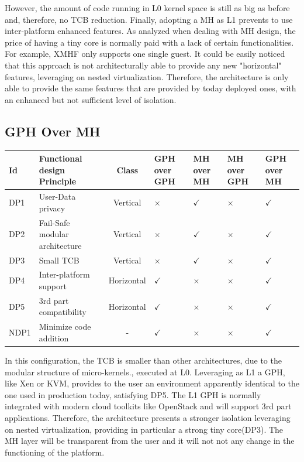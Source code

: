 \documentclass{sig-alternate}
\begin{document}
However, the amount of code running in L0 kernel space is still as big as before and, therefore, no TCB reduction. 
Finally, adopting a MH as L1 prevents to use inter-platform enhanced features. As analyzed when dealing with MH design, the price of having a tiny core is normally paid with a lack of certain functionalities. For example, XMHF only supports one single guest. It could be easily noticed that this approach is not architecturally able to provide any new "horizontal" features, leveraging on nested virtualization. Therefore, the architecture is only able to provide the same features that are provided by today deployed ones, with an enhanced but not sufficient level of isolation.

\subsection{GPH Over MH}
\label{par:gom}

\begin{table}
\label{fin:conf}
\centering
\begin{tabular}{llcllll}
\toprule
Id & Functional design Principle & Class & GPH over GPH & MH over MH & MH over GPH & GPH over MH\\
\midrule
DP1 & User-Data privacy & Vertical & $\times$  & $\checkmark$ & $\times $ & $\checkmark$ \\
DP2 & Fail-Safe modular architecture & Vertical & $\times$  & $\checkmark$ & $\times$ & $\checkmark$ \\
DP3 & Small TCB & Vertical &  $\times$& $\checkmark$ & $\times$ & $\checkmark$ \\
DP4 & Inter-platform support & Horizontal & $\checkmark$  & $\times$ & $\times$ & $\checkmark$ \\
DP5 & 3rd part compatibility & Horizontal & $\checkmark$  & $\times$ & $\times$ & $\checkmark$ \\
NDP1 & Minimize code addition & - & $\checkmark$  & $\times$ & $\times$ & $\checkmark$ \\
\bottomrule
\end{tabular}
\end{table}

In this configuration, the TCB is smaller than other architectures, due to the modular structure of micro-kernels., executed at L0. Leveraging as L1 a GPH, like Xen or KVM, provides to the user an environment apparently  identical to the one used in production today, satisfying DP5. The L1 GPH is normally integrated with modern cloud toolkits like OpenStack and will support 3rd part applications.
Therefore, the architecture presents a stronger isolation leveraging on nested virtualization, providing in particular a strong tiny core(DP3). The MH layer will be transparent from the user and it will not not any change in the functioning of the platform.
\end{document}
